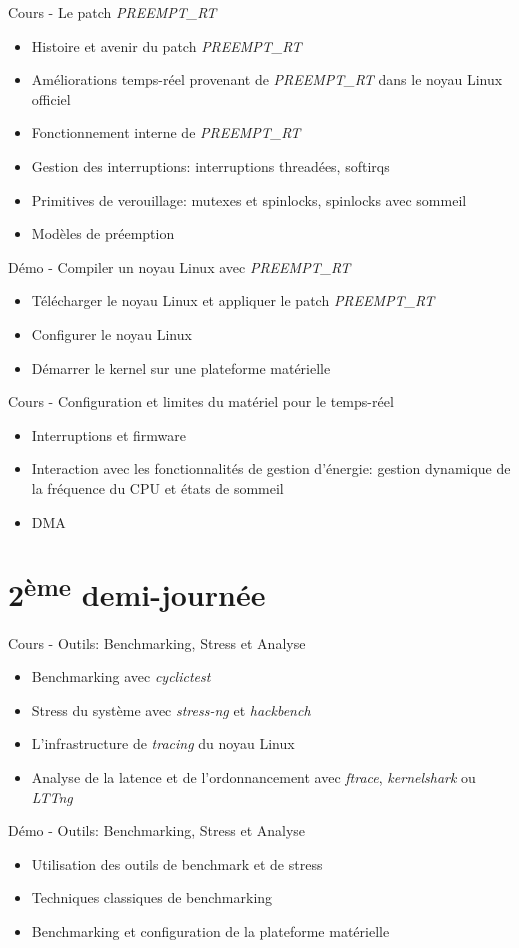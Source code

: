\documentclass[a4paper,12pt,obeyspaces,spaces,hyphens]{article}
\begin{document}
\feagendatwocolumn
{Cours - Le patch {\em PREEMPT\_RT}}
{
  \begin{itemize}
  \item Histoire et avenir du patch {\em PREEMPT\_RT}
  \item Améliorations temps-réel provenant de {\em PREEMPT\_RT} dans le noyau Linux officiel
  \item Fonctionnement interne de {\em PREEMPT\_RT}
  \item Gestion des interruptions: interruptions threadées, softirqs
  \item Primitives de verouillage: mutexes et spinlocks, spinlocks avec sommeil
  \item Modèles de préemption
  \end{itemize}
}
{Démo - Compiler un noyau Linux avec {\em PREEMPT\_RT}}
{
  \begin{itemize}
  \item Télécharger le noyau Linux et appliquer le patch {\em PREEMPT\_RT}
  \item Configurer le noyau Linux
  \item Démarrer le kernel sur une plateforme matérielle
 \end{itemize}
}

\feagendaonecolumn
{Cours - Configuration et limites du matériel pour le temps-réel}
{
  \begin{itemize}
  \item Interruptions et firmware
  \item Interaction avec les fonctionnalités de gestion d'énergie:
    gestion dynamique de la fréquence du CPU et états de sommeil
  \item DMA
  \end{itemize}
}

\section{2\textsuperscript{ème} demi-journée}

\feagendatwocolumn
{Cours - Outils: Benchmarking, Stress et Analyse}
{
  \begin{itemize}
  \item Benchmarking avec {\em cyclictest}
  \item Stress du système avec {\em stress-ng} et {\em hackbench}
  \item L'infrastructure de {\em tracing} du noyau Linux
  \item Analyse de la latence et de l'ordonnancement avec {\em
      ftrace}, {\em kernelshark} ou {\em LTTng}
  \end{itemize}
}
{Démo - Outils: Benchmarking, Stress et Analyse}
{
  \begin{itemize}
  \item Utilisation des outils de benchmark et de stress
  \item Techniques classiques de benchmarking
  \item Benchmarking et configuration de la plateforme matérielle
  \end{itemize}
}
\end{document}
